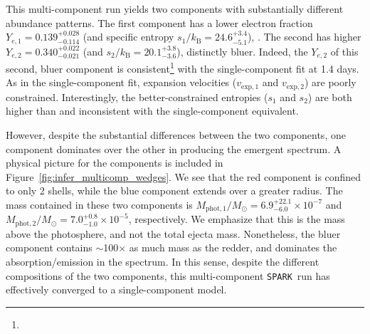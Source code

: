 \documentclass[twocolumn,twocolappendix]{aastex63}
\def\SPARK{\texttt{SPARK}}
\begin{document}
This multi-component run yields two components with substantially different abundance patterns.  The first component has a lower electron fraction $Y_{e,1} = 0.139^{+0.028}_{-0.114}$ (and specific entropy $s_1 / k_{\mathrm{B}} = 24.6^{+3.4}_{-5.1}$), . The second has higher $Y_{e,2} = 0.340^{+0.022}_{-0.021}$ (and $s_2 / k_{\mathrm{B}} = 20.1^{+3.8}_{-3.6}$), distinctly bluer. Indeed, the $Y_{e,2}$ of this second, bluer component is consistent\footnote{} with the single-component fit at 1.4 days. As in the single-component fit, expansion velocities ($v_{\mathrm{exp},1}$ and $v_{\mathrm{exp},2}$) are poorly constrained.  Interestingly, the better-constrained entropies ($s_1$ and $s_2$) are both higher than and inconsistent with the single-component equivalent.

However, despite the substantial differences between the two components, one component dominates over the other in producing the emergent spectrum. A physical picture for the components is included in Figure~\ref{fig:infer_multicomp_wedges}. We see that the red component is confined to only 2 shells, while the blue component extends over a greater radius. The mass contained in these two components is $M_{\mathrm{phot},1}/M_{\odot} = 6.9^{+22.1}_{-6.0} \times 10^{-7}$ and $M_{\mathrm{phot},2}/M_{\odot} = 7.0^{+0.8}_{-1.0} \times 10^{-5}$, respectively. We emphasize that this is the mass above the photosphere, and not the total ejecta mass. Nonetheless, the bluer component contains $\sim$100$\times$ as much mass as the redder, and dominates the absorption/emission in the spectrum.  In this sense, despite the different compositions of the two components, this multi-component \SPARK~run has effectively converged to a single-component model.
\end{document}
